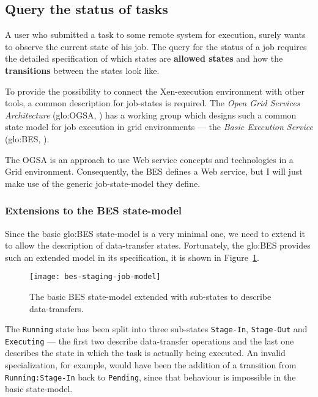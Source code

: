\subsection{Query the status of tasks}
\label{sec:status-query}

A user  who submitted a task  to some remote system  for execution, surely
wants to observe the current state of his job. The query for the status of
a   job  requires  the   detailed  specification   of  which   states  are
\textbf{allowed  states}  and  how  the \textbf{transitions}  between  the
states look like.

To provide  the possibility to connect the  Xen-execution environment with
other  tools,  a  common  description  for job-states  is  required.   The
\emph{Open Grid Services Architecture} (\gls{glo:OGSA}, \cite{ogsa}) has a
working group which designs such a common state model for job execution in
grid environments  --- the \emph{Basic  Execution Service} (\gls{glo:BES},
\cite{ogsa-bes}).

The OGSA is an approach to  use Web service concepts and technologies in a
Grid  environment. Consequently, the BES defines a Web service, but I will
just make use of the generic job-state-model they define.

\subsubsection{Extensions to the BES state-model}

Since the basic  \gls{glo:BES} state-model is a very  minimal one, we need
to  extend   it  to  allow   the  description  of   data-transfer  states.
Fortunately,  the \gls{glo:BES}  provides such  an extended  model  in its
specification, it is shown in Figure~\ref{fig:bes-extended}.

\begin{figure}
  \centering
  \texttt{[image: bes-staging-job-model]}
  \caption[BES State Model Staging Extension]{The basic BES state-model
    extended with sub-states to describe data-transfers.}
  \label{fig:bes-extended}
\end{figure}

The  \texttt{Running}   state  has   been  split  into   three  sub-states
\texttt{Stage-In}, \texttt{Stage-Out} and \texttt{Executing} --- the first
two describe data-transfer operations and the last one describes the state
in which the task is  actually being executed.  An invalid specialization,
for  example,  would   have  been  the  addition  of   a  transition  from
\texttt{Running:Stage-In} back  to \texttt{Pending}, since  that behaviour
is impossible in the basic state-model.

